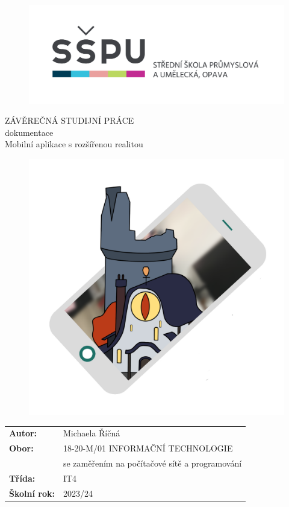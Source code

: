 \documentclass[12pt, a4paper,
twoside,        %
openright
]{report}
\title{\nazevPrace} %
\author{\jmenoAutora} %
\date{\datumOdevzdani} %
\newcommand\obor{INFORMAČNÍ TECHNOLOGIE} %
\newcommand\kodOboru{18-20-M/01} %
\newcommand\zamereni{se zaměřením na počítačové sítě a programování} %
\newcommand\trida{IT4} %
\newcommand\jmenoAutora{Michaela Říčná}  %
\newcommand\skolniRok{2023/24} %
\newcommand\nazevPrace{Mobilní aplikace s rozšířenou realitou} %
\begin{document}
	
	\pagestyle{empty}
	
	\cleardoublepage

	
	{\selectfont
		\begin{figure}[h]
			\centering
			\includegraphics[width=0.6\linewidth]{image/logo-skoly.png} 
		\end{figure}
		
		
		{\bfseries %
			\begin{center}
				\vspace{0.025 \textheight}
				\LARGE{ZÁVĚREČNÁ STUDIJNÍ PRÁCE}\\
				\large{dokumentace}\\
				\vspace{0.075 \textheight}
				\LARGE {\nazevPrace}\\
			\end{center}  
		}%
		
		\begin{figure}[h]
			\centering
			\includegraphics[width=0.5\linewidth]{image/logo.png} 
		\end{figure}
		
		\vspace{0.02 \textheight}
		\begin{table}[h!]
			\begin{tabular}{ll}
				\textbf{Autor:} & \jmenoAutora\\ 
				\textbf{Obor:} & \kodOboru { } \obor\\
				\textbf{} & \zamereni\\
				\textbf{Třída:} & \trida\\
				\textbf{Školní rok:} & \skolniRok\\
			\end{tabular}
			
		\end{table}		
	}
	
\end{document}
